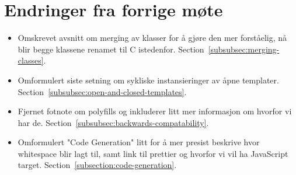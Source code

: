 
\chapter*{Endringer fra forrige møte}

\begin{itemize}
    \item Omskrevet avsnitt om merging av klasser for å gjøre den mer forståelig, nå blir begge klassene renamet til C istedenfor.
    Section~\vref{subsubsec:merging-classes}.
    \item Omformulert siste setning om sykliske instansieringer av åpne templater.
    Section~\vref{subsubsec:open-and-closed-templates}.
    \item Fjernet fotnote om polyfills og inkluderer litt mer informasjon om hvorfor vi har de.
    Section~\vref{subsubsec:backwards-compatability}.
    \item Omformulert "Code Generation" litt for å mer presist beskrive hvor whitespace blir lagt til, samt link til prettier og hvorfor vi vil ha JavaScript target.
    Section~\vref{subsection:code-generation}.
\end{itemize}

